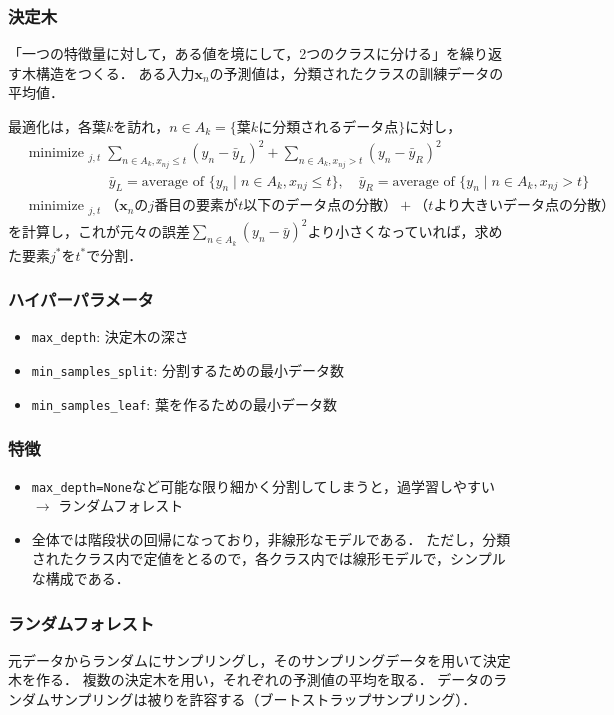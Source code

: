 \documentclass[a4paper,lualatex,ja=standard,oneside,fleqn]{bxjsarticle}
\DeclareMathOperator*{\minimize}{minimize\ }
\begin{document}
\subsubsection{決定木}
「一つの特徴量に対して，ある値を境にして，2つのクラスに分ける」を繰り返す木構造をつくる．
ある入力$\bm{x}_n$の予測値は，分類されたクラスの訓練データの平均値．

最適化は，各葉$k$を訪れ，$n\in A_k = \{\text{葉$k$に分類されるデータ点}\}$に対し，
\begin{align*}
  &\minimize_{j,t} \sum_{n\in{A_k}, x_{nj}\leq t}(y_n-\bar{y}_{L})^2 + \sum_{n\in{A_k}, x_{nj}>t}(y_n-\bar{y}_{R})^2\\
  &\qquad\qquad\qquad\bar{y}_L=\text{average of }\{y_n\mid n\in{A_k}, x_{nj}\leq t\},\quad \bar{y}_R=\text{average of }\{y_n\mid n\in{A_k}, x_{nj}> t\}\\
  &\minimize_{j,t} \text{（$\bm{x}_n$の$j$番目の要素が$t$以下のデータ点の分散）} + \text{（$t$より大きいデータ点の分散）}
\end{align*}
を計算し，これが元々の誤差$\displaystyle\sum_{n\in A_k}(y_n-\bar{y})^2$より小さくなっていれば，求めた要素$j^\ast$を$t^\ast$で分割．

\subsubsection*{ハイパーパラメータ}
\begin{itemize}
  \item \verb|max_depth|: 決定木の深さ
  \item \verb|min_samples_split|: 分割するための最小データ数
  \item \verb|min_samples_leaf|: 葉を作るための最小データ数
\end{itemize}
\subsubsection*{特徴}
\begin{itemize}
  \item \verb|max_depth=None|など可能な限り細かく分割してしまうと，過学習しやすい $\to$ ランダムフォレスト
  \item 全体では階段状の回帰になっており，非線形なモデルである．
  ただし，分類されたクラス内で定値をとるので，各クラス内では線形モデルで，シンプルな構成である．
\end{itemize}

\subsubsection{ランダムフォレスト}
元データからランダムにサンプリングし，そのサンプリングデータを用いて決定木を作る．
複数の決定木を用い，それぞれの予測値の平均を取る．
データのランダムサンプリングは被りを許容する（ブートストラップサンプリング）．
\end{document}

